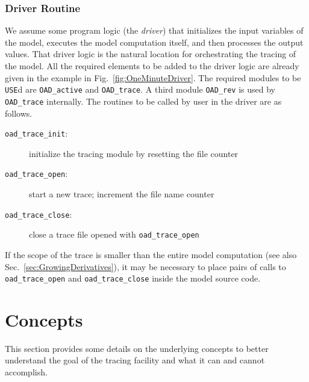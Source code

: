 \documentclass{article}
\newcommand{\refsec}[1]{{Sec.~\ref{#1}}}
\newcommand{\reffig}[1]{{Fig.~\ref{#1}}}
\begin{document}
\subsubsection{Driver Routine}\label{sec:DriverRoutine}

We assume some program logic (the {\em driver}) 
that initializes the input variables of the model, executes the model 
computation itself, and then processes the output values. 
That driver logic  is the natural location for orchestrating the tracing of the model. 
All the required elements to be added to the driver logic are already given in the example 
in \reffig{fig:OneMinuteDriver}. The required modules to be \lstinline{USE}d 
are \lstinline{OAD_active} and 
\lstinline{OAD_trace}. A third module \lstinline{OAD_rev} is used by \lstinline{OAD_trace}
internally. The routines to be called by user in the driver are as follows.
\begin{description}
\item[{\tt oad\_trace\_init}:] initialize the tracing module by resetting the file counter
\item[{\tt oad\_trace\_open}:] start a new trace; increment the file name counter 
\item[{\tt oad\_trace\_close}:] close a trace file opened with \lstinline{oad_trace_open}
\end{description}   
If the scope of the trace is smaller than the 
entire model computation (see also \refsec{sec:GrowingDerivatives}),
it may be necessary to place pairs of calls to \lstinline{oad_trace_open} 
and \lstinline{oad_trace_close} inside the model 
source code. 

\section{Concepts}
This section provides some details on the underlying concepts to 
better understand the goal of the tracing facility and what it can and cannot accomplish. 
\end{document}
